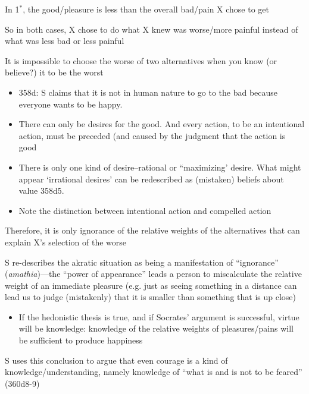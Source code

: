 \documentclass[oneside]{article}
\begin{document}
\begin{itemize}
 \noindent [P4] In 1$^{*}$, the good/pleasure is less than the overall bad/pain X chose to get
 \vspace*{2mm}
 
 \noindent [P5] So in both cases, X chose to do what X knew was worse/more painful instead of what was less bad or less painful
 \vspace*{2mm}
 
 \noindent [P6] It is impossible to choose the worse of two alternatives when you know (or believe?) it to be the worst
 
 \vspace*{2mm}
 \begin{itemize}
 \item  358d: S claims that it is not in human nature to go to the bad because everyone wants to be happy.
 \item There can only be desires for the good. And every action, to be an intentional action, must be preceded (and caused by the judgment that the action is good
 \item There is only one kind of desire--rational or ``maximizing' desire. What might appear `irrational desires' can be redescribed as (mistaken) beliefs about value 358d5. 
 \item Note the distinction between intentional action and compelled action
 \end{itemize}

 \noindent [C] Therefore, it is only ignorance of the relative weights of the alternatives that can explain X's selection of the worse
\vspace*{2mm}
 
 \noindent S re-describes the akratic situation as being a manifestation of ``ignorance'' (\emph{amathia})---the ``power of appearance'' leads a person to miscalculate the relative weight of an immediate pleasure (e.g. just as seeing something in a distance can lead us to judge (mistakenly) that it is smaller than something that is up close)
 \begin{itemize}
 \item If the hedonistic thesis is true, and if Socrates' argument is successful, virtue will be knowledge: knowledge of the relative weights of pleasures/pains will be sufficient to produce happiness
 \end{itemize}
 \vspace*{2mm}
 
 \noindent S uses this conclusion to argue that even courage is a kind of knowledge/understanding, namely knowledge of ``what is and is not to be feared'' (360d8-9)
 

\end{itemize}
\end{document}

